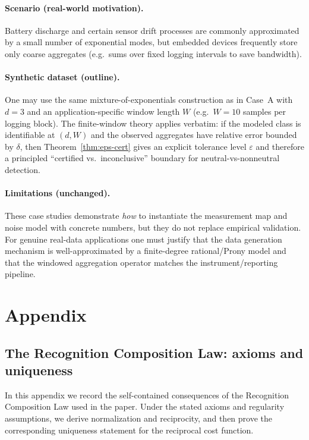 \documentclass[11pt,reqno]{amsart}
\theoremstyle{definition}
\theoremstyle{remark}
\newcommand{\1}{\mathbf{1}}
\newcommand{\eps}{\varepsilon}
\begin{document}
\paragraph{Scenario (real-world motivation).}
Battery discharge and certain sensor drift processes are commonly approximated by a small number of exponential modes, but embedded devices frequently store only coarse aggregates (e.g.\ sums over fixed logging intervals to save bandwidth).

\paragraph{Synthetic dataset (outline).}
One may use the same mixture-of-exponentials construction as in Case~A with $d=3$ and an application-specific window length $W$ (e.g.\ $W=10$ samples per logging block).
The finite-window theory applies verbatim: if the modeled class is identifiable at $(d,W)$ and the observed aggregates have relative error bounded by $\delta$, then Theorem~\ref{thm:eps-cert} gives an explicit tolerance level $\eps$ and therefore a principled ``certified vs.\ inconclusive'' boundary for neutral-vs-nonneutral detection.

\paragraph{Limitations (unchanged).}
These case studies demonstrate \emph{how} to instantiate the measurement map and noise model with concrete numbers, but they do not replace empirical validation.
For genuine real-data applications one must justify that the data generation mechanism is well-approximated by a finite-degree rational/Prony model and that the windowed aggregation operator matches the instrument/reporting pipeline.


\appendix
\label{app:RCL}
\section*{Appendix}
\setcounter{subsection}{0}
\subsection*{The Recognition Composition Law: axioms and uniqueness}

In this appendix we record the self-contained consequences of the Recognition Composition Law used in the paper. Under the stated axioms and regularity assumptions, we derive normalization and reciprocity, and then prove the corresponding uniqueness statement for the reciprocal cost function.
\end{document}
